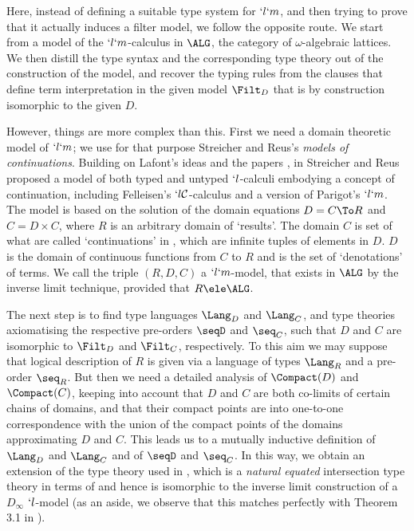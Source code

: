\documentclass{lmcs}
\begin{document}
Here, instead of defining a suitable type system for $`l`m$, and then trying to prove that it actually induces a filter model, we follow the opposite route. 
We start from a model of the $`l`m$-calculus in $\ALG$, the category of $\omega$-algebraic lattices. 
We then distill the type syntax and the corresponding type theory out of the construction of the model, and recover the typing rules from the clauses that define term interpretation in the given model $\Filt_D$ that is by construction isomorphic to the given $D$.

However, things are %
more complex than this. 
First we need a domain theoretic model of $`l`m$; we use for that purpose Streicher and Reus's \emph{models of continuations}. 
Building on Lafont's ideas and the papers \cite{Lafont-Reus-Streicher'93,Ong-Stewart'97}, in \cite{Streicher-Reus'98} Streicher and Reus proposed a model of both typed and untyped $`l$-calculi embodying a concept of continuation, including Felleisen's $`l{\mathcal C}$-calculus \cite{Felleisen-Friedman-Kohlbecker'86,Felleisen-PhD'87} and a version of Parigot's $`l`m$.
The model is based on the solution of the domain equations $D = C\To R$ and $C = D \times C$, where $R$ is an arbitrary domain of `results'. 
The domain $C$ is set of what are called `continuations' in \cite{Streicher-Reus'98}, which are infinite tuples of elements in $D$. 
$D$ is the domain of continuous functions from $C$ to $R$ and is the set of `denotations' of terms. 
We call the triple $(R,D,C)$ a $`l`m$-model, that exists in $\ALG$ by the inverse limit technique, provided that $R\ele \ALG$. 

The next step is to find type languages $\Lang_D$ and $\Lang_C$, and type theories axiomatising the respective pre-orders $\seqD$ and $\seq_C$, such that $D$ and $C$ are isomorphic to $\Filt_D$ and $\Filt_C$, respectively. 
To this aim we may suppose that logical description of $R$ is given via a language of types $\Lang_R$ and a pre-order $\seq_R$.
But then we need a detailed analysis of $\Compact(D)$ and $\Compact(C)$, keeping into account that $D$ and $C$ are both co-limits of certain chains of domains, and that their compact points are into one-to-one correspondence with the union of the compact points of the domains approximating $D$ and $C$.
This leads us to a mutually inductive definition of $\Lang_D$ and $\Lang_C$ and of $\seqD$ and $\seq_C$.
In this way, we obtain an extension of the type theory used in \cite{BCD'83}, which is a \emph{natural equated} intersection type theory in terms of \cite{Alessi-Severi'08} and hence is isomorphic to the inverse limit construction of a $D_ \infty$ $`l$-model (as an aside, we observe that this matches perfectly with Theorem 3.1 in \cite{Streicher-Reus'98}).
\end{document}
